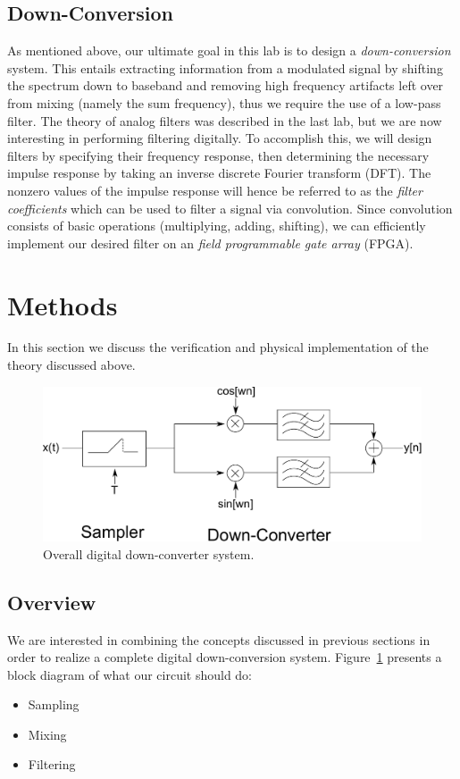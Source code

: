 \documentclass[11pt]{article}
\begin{document}
    \subsection{Down-Conversion}
    As mentioned above, our ultimate goal in this lab is to design a \emph{down-conversion} system. This entails extracting information from a modulated signal by shifting the spectrum down to baseband and removing high frequency artifacts left over from mixing (namely the sum frequency), thus we require the use of a low-pass filter. The theory of analog filters was described in the last lab, but we are now interesting in performing filtering digitally. To accomplish this, we will design filters by specifying their frequency response, then determining the necessary impulse response by taking an inverse discrete Fourier transform (DFT). The nonzero values of the impulse response will hence be referred to as the \emph{filter coefficients} which can be used to filter a signal via convolution. Since convolution consists of basic operations (multiplying, adding, shifting), we can efficiently implement our desired filter on an \emph{field programmable gate array} (FPGA).

\section{Methods}
In this section we discuss the verification and physical implementation of the theory discussed above.

\begin{figure}[H]
    \centering
        \includegraphics[width = \textwidth]{down-converter.pdf}
    \caption{Overall digital down-converter system.}
    \label{bd}
\end{figure}

    \subsection{Overview}
    We are interested in combining the concepts discussed in previous sections in order to realize a complete digital down-conversion system. Figure~\ref{bd} presents a block diagram of what our circuit should do:
    \begin{itemize}
        \item Sampling
        \item Mixing
        \item Filtering
    \end{itemize}
\end{document}
